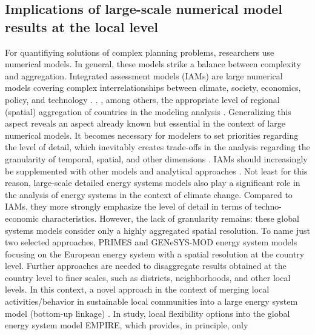 \subsection{Implications of large-scale numerical model results at the local level}
For quantifiying solutions of complex planning problems, researchers use numerical models. In general, these models strike a balance between complexity and aggregation. Integrated assessment models (IAMs) are large numerical models covering complex interrelationships between climate, society, economics, policy, and technology \cite{dowlatabadi1995integrated}. . , among others, the appropriate level of regional (spatial) aggregation of countries in the modeling analysis . Generalizing this aspect reveals an aspect already known but essential in the context of large numerical models. It becomes necessary for modelers to set priorities regarding the level of detail, which inevitably creates trade-offs in the analysis regarding the granularity of temporal, spatial, and other dimensions \cite{gargiulo2013long}. IAMs should  increasingly be supplemented with other models and analytical approaches . Not least for this reason, large-scale detailed energy systems models also play a significant role in the analysis of energy systems in the context of climate change. Compared to IAMs, they more strongly emphasize the level of detail in terms of techno-economic characteristics. However, the lack of granularity remains: these global systems models consider only a highly aggregated spatial resolution. To name just two selected approaches, PRIMES\deleted{)}  and GENeSYS-MOD\deleted{)}   energy system models focusing on the European energy system with a spatial resolution at the country level. Further approaches are needed to disaggregate results obtained at the country level to finer scales, such as districts, neighborhoods, and other local levels. In this context, a novel approach in the context of merging local activities/behavior in sustainable local communities into a large energy system model (bottom-up linkage) . In  study, local flexibility options  into the global energy system model EMPIRE, which provides, in principle, only 